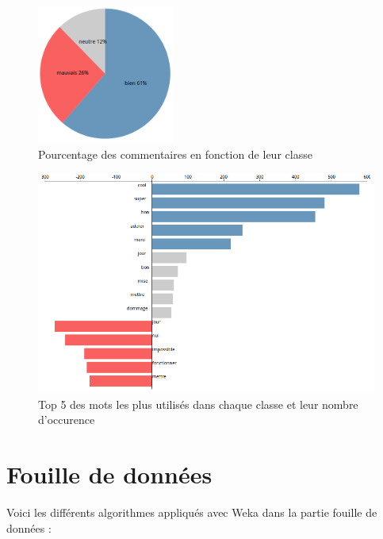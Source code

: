 \documentclass[a4paper, 11pt]{article}
\begin{document}
\begin{figure}[h]
\begin{center}
\includegraphics[width=0.4\textwidth]{visu1.png}
\end{center}
\caption{Pourcentage des commentaires en fonction de leur classe}\label{camembert}
\end{figure}

\begin{figure}[h]
\begin{center}
\includegraphics[width=\textwidth]{visu2.png}
\end{center}
\caption{Top 5 des mots les plus utilisés dans chaque classe et leur nombre d'occurence}\label{histogramme}
\end{figure}
\clearpage

\section{Fouille de données}\label{fouille}

Voici les différents algorithmes appliqués avec Weka dans la partie fouille de données : \\
\end{document}
